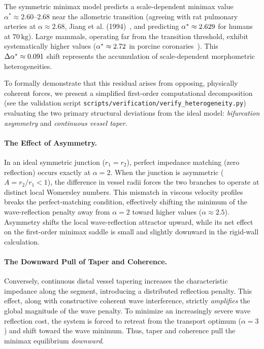 \documentclass[11pt,a4paper]{article}
\theoremstyle{remark}
\begin{document}
The symmetric minimax model predicts a scale-dependent minimax value $\alpha^*
\approx 2.60\text{--}2.68$ near the allometric transition (agreeing with rat
pulmonary arteries at $\alpha \approx 2.68$, Jiang et al.
(1994)~\cite{jiang1994}, and predicting $\alpha^* \approx 2.629$
for humans at $70\,\mathrm{kg}$). Large mammals, operating far from the
transition threshold, exhibit systematically higher values ($\alpha^* \approx
2.72$ in porcine coronaries~\cite{kassab1993}). This $\Delta\alpha^*
\approx 0.091$ shift represents the accumulation of scale-dependent
morphometric heterogeneities.

To formally demonstrate that this residual arises from opposing, physically
coherent forces, we present a simplified first-order computational decomposition
(see the validation script
\texttt{scripts/verification/verify\_heterogeneity.py}) evaluating the two
primary structural deviations from the ideal model: \emph{bifurcation asymmetry}
and \emph{continuous vessel taper}.

\paragraph{The Effect of Asymmetry.}
In an ideal symmetric junction ($r_1 = r_2$), perfect impedance matching (zero
reflection) occurs exactly at $\alpha = 2$. When the junction is asymmetric ($A
= r_2/r_1 < 1$), the difference in vessel radii forces the two branches to
operate at distinct local Womersley numbers. This mismatch in viscous velocity
profiles breaks the perfect-matching condition, effectively shifting the minimum
of the wave-reflection penalty away from $\alpha=2$ toward higher values
($\alpha \approx 2.5$). Asymmetry shifts the local wave-reflection
attractor upward, while its net effect on the first-order minimax saddle is
small and slightly downward in the rigid-wall calculation.

\paragraph{The Downward Pull of Taper and Coherence.}
Conversely, continuous distal vessel tapering increases the characteristic
impedance along the segment, introducing a distributed reflection penalty. This
effect, along with constructive coherent wave interference, strictly
\emph{amplifies} the global magnitude of the wave penalty. To minimize an
increasingly severe wave reflection cost, the system is forced to retreat from
the transport optimum ($\alpha=3$) and shift toward the wave minimum. Thus,
taper and coherence pull the minimax equilibrium \emph{downward}.
\end{document}
